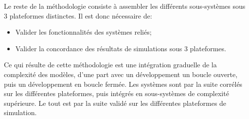 Le reste de la méthodologie consiste à assembler les différents sous-systèmes sous 3 plateformes distinctes. Il est donc nécessaire de:
\begin{itemize}
\item Valider les fonctionnalités des systèmes reliés;
\item Valider la concordance des résultats de simulations sous 3 plateformes.
\end{itemize}

Ce qui résulte de cette méthodologie est une intégration graduelle de la complexité des modèles, d'une part avec un développement un boucle ouverte, puis un développement en boucle fermée. Les systèmes sont par la suite corrélés sur les différentes plateformes, puis intégrés en sous-systèmes de complexité supérieure. Le tout est par la suite validé sur les différentes plateformes de simulation.